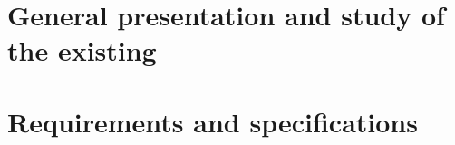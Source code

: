 \documentclass{polypfe}
\begin{document}
\tableofcontents

\newpage

\listoffigures

\newpage

\listoftables

\newpage



\newpage





\chapter{General presentation and study of the existing}
\clearpage








\chapter{Requirements and specifications}
\clearpage





%
%

\end{document}
